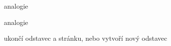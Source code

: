 \documentclass{article}
\begin{document}
\pagebreak[1]
\nopagebreak[1]
analogie \linebreak

\nopagebreak
analogie \pagebreak


\newpage
\clearpage
\cleardoublepage
ukončí odstavec a stránku, nebo vytvoří nový odstavec
\end{document}
